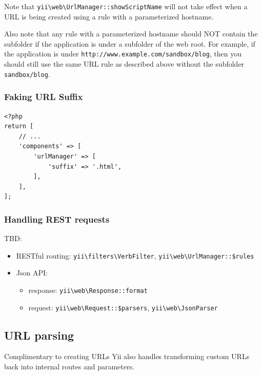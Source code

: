 Note that \texttt{yii{\allowbreak{}\textbackslash}web{\allowbreak{}\textbackslash}UrlManager\allowbreak{}::\allowbreak{}showScriptName} will not take effect when a URL is being created using a rule with a parameterized hostname.

Also note that any rule with a parameterized hostname should NOT contain the subfolder if the application is under
a subfolder of the web root. For example, if the application is under \lstinline|http://www.example.com/sandbox/blog|, then you
should still use the same URL rule as described above without the subfolder \lstinline|sandbox/blog|.

\subsubsection{Faking URL Suffix}
\lstset{language=php}\begin{lstlisting}
<?php
return [
    // ...
    'components' => [
        'urlManager' => [
            'suffix' => '.html',
        ],
    ],
];
\end{lstlisting}
\subsubsection{Handling REST requests}
TBD:

\begin{itemize}
\item RESTful routing: \texttt{yii{\allowbreak{}\textbackslash}filters{\allowbreak{}\textbackslash}VerbFilter}, \texttt{yii{\allowbreak{}\textbackslash}web{\allowbreak{}\textbackslash}UrlManager\allowbreak{}::\allowbreak{}\$rules}
\item Json API:\begin{itemize}
\item response: \texttt{yii{\allowbreak{}\textbackslash}web{\allowbreak{}\textbackslash}Response\allowbreak{}::\allowbreak{}format}
\item request: \texttt{yii{\allowbreak{}\textbackslash}web{\allowbreak{}\textbackslash}Request\allowbreak{}::\allowbreak{}\$parsers}, \texttt{yii{\allowbreak{}\textbackslash}web{\allowbreak{}\textbackslash}JsonParser}
\end{itemize}

\end{itemize}
\subsection{URL parsing}
Complimentary to creating URLs Yii also handles transforming custom URLs back into internal routes and parameters.

